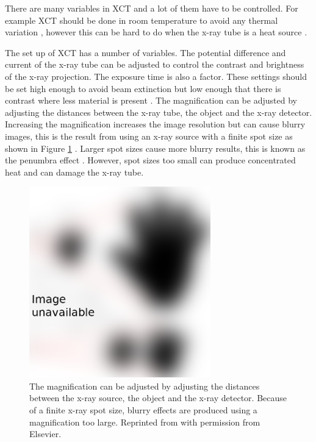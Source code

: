 There are many variables in XCT and a lot of them have to be controlled. For example XCT should be done in room temperature to avoid any thermal variation \citep{bryan1990international}, however this can be hard to do when the x-ray tube is a heat source \citep{kruth2011computed}.

The set up of XCT has a number of variables. The potential difference and current of the x-ray tube can be adjusted to control the contrast and brightness of the x-ray projection. The exposure time is also a factor. These settings should be set high enough to avoid beam extinction but low enough that there is contrast where less material is present \citep{kruth2011computed}. The magnification can be adjusted by adjusting the distances between the x-ray tube, the object and the x-ray detector. Increasing the magnification increases the image resolution but can cause blurry images, this is the result from using an x-ray source with a finite spot size as shown in Figure \ref{fig:literature_magnification} \citep{kruth2011computed}. Larger spot sizes cause more blurry results, this is known as the penumbra effect \citep{kueh2016modelling}. However, spot sizes too small can produce concentrated heat \citep{welkenhuyzen2009industrial} and can damage the x-ray tube.

\begin{figure}
  \centering
  \includegraphics[width=0.7\textwidth]{../figures/literatureReview/literature_magnification.png}
  \caption{The magnification can be adjusted by adjusting the distances between the x-ray source, the object and the x-ray detector. Because of a finite x-ray spot size, blurry effects are produced using a magnification too large. Reprinted from \cite{kruth2011computed} with permission from Elsevier.}
  \label{fig:literature_magnification}
\end{figure}

